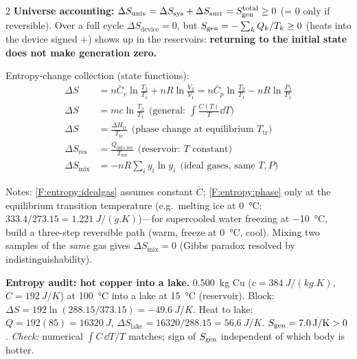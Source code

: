 \begin{multicols}{2}
\textbf{Universe accounting:} $\Delta S_{\text{univ}}=\Delta S_{\text{sys}}+\Delta S_{\text{surr}}=S_{\mathrm{gen}}^{\text{total}}\ge0$ (= 0 only if reversible). Over a full cycle $\Delta S_{\text{device}}=0$, but $S_{\mathrm{gen}}=-\sum_k Q_k/T_k\ge0$ (heats into the device signed $+$) shows up in the reservoirs: \textbf{returning to the initial state does not make generation zero.}

\begin{formulabox}Entropy-change collection (state functions):
\begin{align}
\Delta S &= n\bar C_v\ln\frac{T_2}{T_1}+nR\ln\frac{V_2}{V_1} = n\bar C_p\ln\frac{T_2}{T_1}-nR\ln\frac{P_2}{P_1} \label{F:entropy:idealgas}\\
\Delta S &= mc\ln\frac{T_2}{T_1}\ \ \Big(\text{general: }\int\frac{C(T)}{T}\dd T\Big) \label{F:entropy:incompressible}\\
\Delta S &= \frac{\Delta H_{\text{tr}}}{T_{\text{tr}}}\ \ \text{(phase change at equilibrium } T_{\text{tr}}) \label{F:entropy:phase}\\
\Delta S_{\text{res}} &= \frac{Q_{\text{into res}}}{T_{\text{res}}}\ \ \text{(reservoir: } T \text{ constant)} \label{F:entropy:reservoir}\\
\Delta S_{\text{mix}} &= -nR\sum_i y_i\ln y_i\ \ \text{(ideal gases, same } T,P) \label{F:entropy:mixing}
\end{align}
\end{formulabox}
Notes: \eqref{F:entropy:idealgas} assumes constant $\bar C$; \eqref{F:entropy:phase} only at the equilibrium transition temperature (e.g.\ melting ice at \SI{0}{\celsius}: $333.4/273.15=\SI{1.221}{J/(g.K)}$)---for supercooled water freezing at \SI{-10}{\celsius}, build a three-step reversible path (warm, freeze at \SI{0}{\celsius}, cool). Mixing two samples of the \emph{same} gas gives $\Delta S_{\text{mix}}=0$ (Gibbs paradox resolved by indistinguishability).

\begin{demobox}\textbf{Entropy audit: hot copper into a lake.} \SI{0.500}{kg} Cu ($c=\SI{384}{J/(kg.K)}$, $C=\SI{192}{J/K}$) at \SI{100}{\celsius} into a lake at \SI{15}{\celsius} (reservoir).
Block: $\Delta S=192\ln(288.15/373.15)=\SI{-49.6}{J/K}$. Heat to lake: $Q=192(85)=\SI{16320}{J}$, $\Delta S_{\text{lake}}=16320/288.15=\SI{+56.6}{J/K}$. $S_{\mathrm{gen}}=\SI{7.0}{J/K}>0$ \checkmark.
\emph{Check:} numerical $\int C\,\dd T/T$ matches; sign of $S_{\mathrm{gen}}$ independent of which body is hotter.\end{demobox}


\end{multicols}
